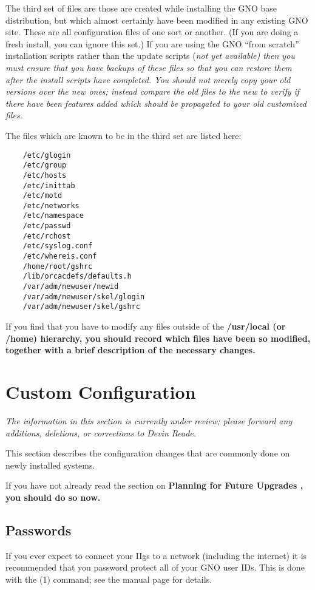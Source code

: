 \documentclass{report}
\begin{document}
The third set of files are those are created while installing the GNO
base distribution, but which almost certainly have been modified in 
any existing GNO site.
These are all configuration files of one sort or another.
(If you are doing a fresh install, you can ignore
this set.)  If you are using the GNO ``from scratch'' installation scripts
rather than the update scripts
(\em not yet available\rm)
then you \em must \rm ensure that you have backups of these files so
that you can restore them after the install scripts have completed.  You
should not merely copy your old versions over the new ones; instead
compare the old files to the new to verify if there have been features
added which should be propagated to your old customized files.

The files which are known to be in the third set are listed here:

\begin{verbatim}
	/etc/glogin
	/etc/group
	/etc/hosts
	/etc/inittab
	/etc/motd
	/etc/networks
	/etc/namespace
	/etc/passwd
	/etc/rchost
	/etc/syslog.conf
	/etc/whereis.conf
	/home/root/gshrc
	/lib/orcacdefs/defaults.h
	/var/adm/newuser/newid
	/var/adm/newuser/skel/glogin
	/var/adm/newuser/skel/gshrc
\end{verbatim}

If you find that you have to modify any files outside of the \bf /usr/local \rm
(or \bf /home\rm ) hierarchy, you should record which files have been so
modified, together with a brief description of the necessary changes.

\section{Custom Configuration}

\it The information in this section is currently under review; please
forward any additions, deletions, or corrections to Devin Reade.\rm

This section describes the configuration changes that are commonly done
on newly installed systems.

If you have not already read the section on \bf Planning for Future 
Upgrades \rm, you should do so now.

\subsection{Passwords}

If you ever expect to connect your IIgs to a network (including the internet)
it is recommended that you password protect all of your GNO user IDs.
This is done with the
(1)
command; see the manual page for details.
\end{document}
